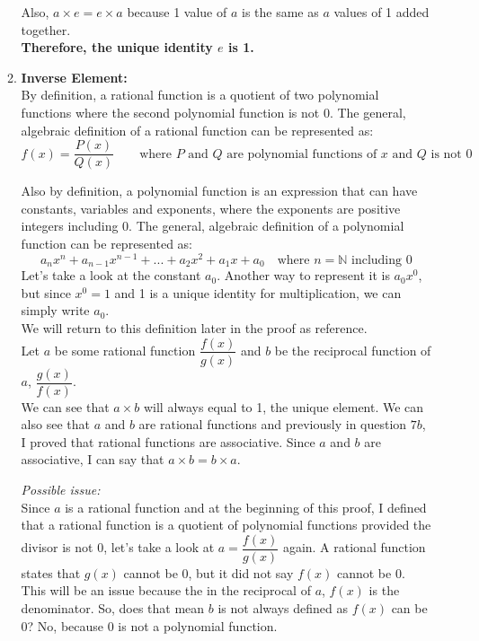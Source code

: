 \documentclass[12pt]{book}
\begin{document}
\begin{enumerate}
\begin{enumerate}
    Also, $a \times e = e \times a$ because 1 value of $a$ is the same as $a$ values of 1 added together.\\
    
    \textbf{Therefore, the unique identity $e$ is 1.}\\
    
    \item \textbf{Inverse Element:}\\
    By definition, a rational function is a quotient of two polynomial functions where the second polynomial function is not 0. The general, algebraic definition of a rational function can be represented as:
    $$f(x) = \dfrac{P(x)}{Q(x)} \qquad \text{where $P$ and $Q$ are polynomial functions of $x$ and $Q$ is not 0}$$
    
    Also by definition, a polynomial function is an expression that can have constants, variables and exponents, where the exponents are positive integers including 0. The general, algebraic definition of a polynomial function can be represented as:
    $$a_nx^n + a_{n-1}x^{n-1} + ... + a_2x^2 + a_1x + a_0 \quad \text{where $n= \mathbb{N}$ including 0}$$
    Let's take a look at the constant $a_0$. Another way to represent it is $a_0x^0$, but since $x^0 = 1$ and 1 is a unique identity for multiplication, we can simply write $a_0$.\\
    We will return to this definition later in the proof as reference.\\
    
    Let $a$ be some rational function $\dfrac{f(x)}{g(x)}$ and $b$ be the reciprocal function of $a$, $\dfrac{g(x)}{f(x)}$.\\
    
    We can see that $a \times b$ will always equal to 1, the unique element. We can also see that $a$ and $b$ are rational functions and previously in question $7b$, I proved that rational functions are associative. Since $a$ and $b$ are associative, I can say that $a \times b = b \times a$.\\
    \newpage
    
    \textit{Possible issue:}\\
    Since $a$ is a rational function and at the beginning of this proof, I defined that a rational function is a quotient of polynomial functions provided the divisor is not 0, let's take a look at $a = \dfrac{f(x)}{g(x)}$ again. A rational function states that $g(x)$ cannot be 0, but it did not say $f(x)$ cannot be 0. This will be an issue because the in the reciprocal of $a$, $f(x)$ is the denominator. So, does that mean $b$ is not always defined as $f(x)$ can be 0? No, because 0 is not a polynomial function.\\
    

\end{enumerate}
\end{enumerate}
\end{document}
